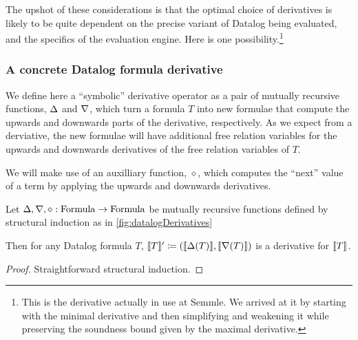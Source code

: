 The upshot of these considerations is that the optimal choice of derivatives is likely
to be quite dependent on the precise variant of Datalog being evaluated, and the
specifics of the evaluation engine. Here is one possibility.\footnote{This is
  the derivative actually in use at Semmle. We arrived at it by starting with the
  minimal derivative and then simplifying and weakening it while preserving the
  soundness bound given by the maximal derivative.}

\subsubsection{A concrete Datalog formula derivative}

We define here a ``symbolic'' derivative operator as a pair of mutually recursive functions,
$\Delta$ and $\nabla$, which turn a formula $T$ into new formulae that compute
the upwards and downwards parts of the derivative, respectively. As we expect
from a derviative, the new formulae will have additional free relation variables
for the upwards and downwards derivatives of the free relation variables of $T$.

\newcommand{\bothdiff}{\diamond}

We will make use of an auxilliary function, $\bothdiff$, which computes the
``next'' value of a term by applying the upwards and downwards derivatives.

\newcommand{\bothchanges}{\rho}
\begin{thm}
\label{thm:concreteDatalog}
  Let $\updiff, \downdiff, \bothdiff : \Formula \rightarrow \Formula$ be mutually recursive functions
  defined by structural induction as in \cref{fig:datalogDerivatives}

  Then for any Datalog formula $T$, 
  $\llbracket T \rrbracket' \coloneqq (\llbracket \Delta(T) \rrbracket, \llbracket \nabla(T) \rrbracket)$
  is a derivative for $\llbracket T \rrbracket$.
\end{thm}
\ifproofs
\begin{proof}
  Straightforward structural induction.
\end{proof}
\fi

